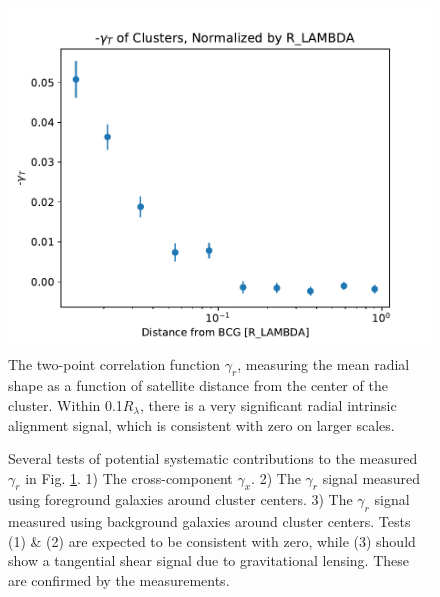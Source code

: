 \documentclass[fleqn,usenatbib]{mnras}
\begin{document}


\begin{figure}
\begin{center}
\includegraphics[width=\columnwidth]{gamma_T_rel.pdf}
\end{center}
\caption[]{The two-point correlation function $\gamma_r$, measuring the mean radial shape as a function of satellite distance from the center of the cluster. Within 0.1$R_\lambda$, there is a very significant radial intrinsic alignment signal, which is consistent with zero on larger scales.
\label{fig:gammar}}
\end{figure}


\begin{figure}
\begin{center}
\end{center}
\missingfigure{}
\caption[]{Several tests of potential systematic contributions to the measured $\gamma_r$ in Fig. \ref{fig:gammar}. 1) The cross-component $\gamma_x$. 2) The $\gamma_r$ signal measured using foreground galaxies around cluster centers. 3) The $\gamma_r$ signal measured using background galaxies around cluster centers. Tests (1) \& (2) are expected to be consistent with zero, while (3) should show a tangential shear signal due to gravitational lensing. These are confirmed by the measurements.
\label{fig:gammax}}
\end{figure}
\end{document}
